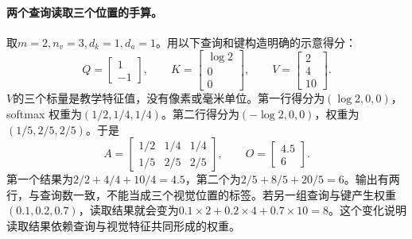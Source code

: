 \paragraph{两个查询读取三个位置的手算。}
取$m=2,n_v=3,d_k=1,d_a=1$。用以下查询和键构造明确的示意得分：
\begin{equation}
 Q=\begin{bmatrix}1\\-1\end{bmatrix},\qquad
 K=\begin{bmatrix}\log2\\0\\0\end{bmatrix},\qquad
 V=\begin{bmatrix}2\\4\\10\end{bmatrix}.
\end{equation}
$V$的三个标量是教学特征值，没有像素或毫米单位。第一行得分为$(\log2,0,0)$，softmax 权重为$(1/2,1/4,1/4)$。第二行得分为$(-\log2,0,0)$，权重为$(1/5,2/5,2/5)$。于是
\begin{equation}
 A=\begin{bmatrix}1/2&1/4&1/4\\1/5&2/5&2/5\end{bmatrix},
 \qquad O=\begin{bmatrix}4.5\\6\end{bmatrix}.
\end{equation}
第一个结果为$2/2+4/4+10/4=4.5$，第二个为$2/5+8/5+20/5=6$。输出有两行，与查询数一致，不能当成三个视觉位置的标签。若另一组查询与键产生权重$(0.1,0.2,0.7)$，读取结果就会变为$0.1\times2+0.2\times4+0.7\times10=8$。这个变化说明读取结果依赖查询与视觉特征共同形成的权重。

